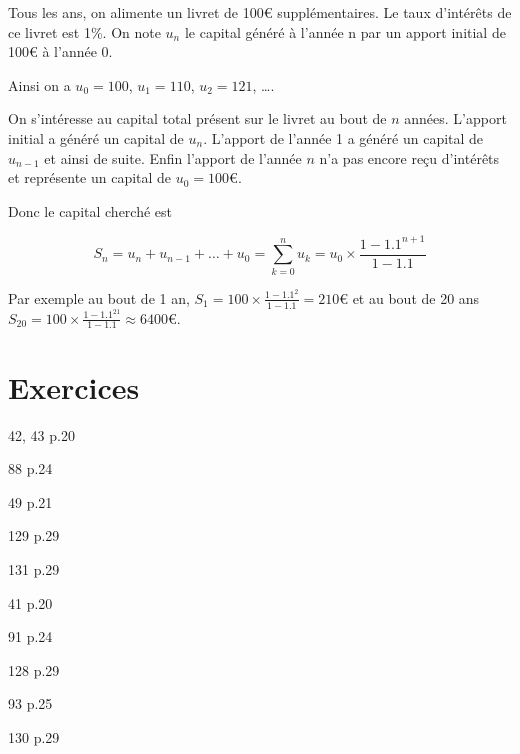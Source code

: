 \documentclass[10pt,a4paper,openany,twoside]{book}
\begin{document}
\begin{ex}{}{}
	Tous les ans, on alimente un livret de 100€ supplémentaires. Le taux d'intérêts de ce livret est 1\%. On note $u_n$ le capital généré à l'année n par un apport initial de 100€ à l'année $0$.

	Ainsi on a $u_0=100$, $u_1=110$, $u_2=121$, \dots.

	On s'intéresse au capital total présent sur le livret au bout de $n$ années. L'apport initial a généré un capital de $u_n$. L'apport de l'année 1 a généré un capital de $u_{n-1}$ et ainsi de suite. Enfin l'apport de l'année $n$ n'a pas encore reçu d'intérêts et représente un capital de $u_0=100$€.

	Donc le capital cherché est

	$$S_n=u_n+u_{n-1}+\dots+u_0 = \sum_{k=0}^{n} u_k = u_0\times\frac{1-1.1^{n+1}}{1-1.1}$$

	Par exemple au bout de 1 an, $S_1 = 100\times\frac{1-1.1^{2}}{1-1.1} = 210$€ et au bout de 20 ans $S_{20} = 100\times\frac{1-1.1^{21}}{1-1.1} \approx 6400$€.
\end{ex}

\newpage
\section*{Exercices}
		\begin{bookexos}{42, 43 p.20}\end{bookexos}
		\begin{bookexo}{88 p.24}\end{bookexo}
		\begin{bookexos}{49 p.21}\end{bookexos}
		\begin{bookexo}{129 p.29\train}\end{bookexo}
		\begin{bookexo}{131 p.29\train}\end{bookexo}

			\begin{bookexo}{41 p.20}\end{bookexo}
		\begin{bookexo}{91 p.24}\end{bookexo}
		\begin{bookexo}{128 p.29\train}\end{bookexo}

	\begin{bookexo}{93 p.25}\end{bookexo}
	\begin{bookexo}{130 p.29\train}\end{bookexo}
\end{document}
